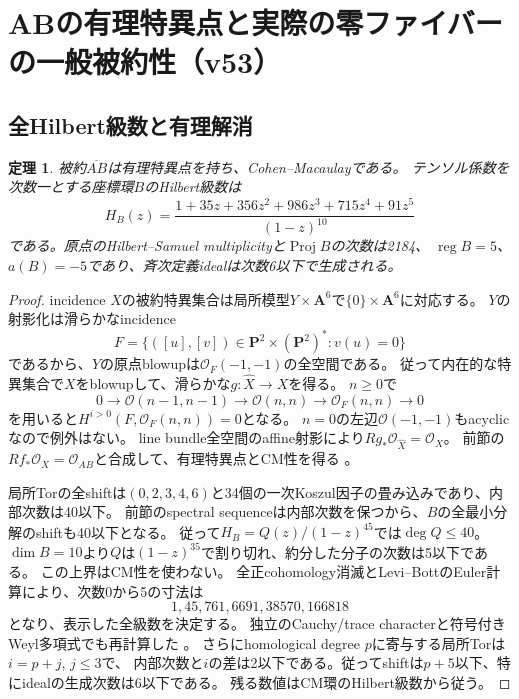 \documentclass[11pt,a4paper]{ltjsarticle}
\newcommand{\PP}{\mathbf P}
\renewcommand{\AA}{\mathbf A}
\newtheorem{theorem}{定理}[section]
\theoremstyle{remark}
\begin{document}
\section{ABの有理特異点と実際の零ファイバーの一般被約性（v53）}
\label{sec:v53}
\subsection{全Hilbert級数と有理解消}
\begin{theorem}
被約$\overline{AB}$は有理特異点を持ち、Cohen--Macaulayである。
テンソル係数を次数一とする座標環$B$のHilbert級数は
\[
 H_B(z)=\frac{1+35z+356z^2+986z^3+715z^4+91z^5}{(1-z)^{10}}
\]
である。原点のHilbert--Samuel multiplicityと$\operatorname{Proj}B$の次数は2184、
$\operatorname{reg}B=5$、$a(B)=-5$であり、斉次定義idealは次数6以下で生成される。
\end{theorem}
\begin{proof}
incidence $X$の被約特異集合は局所模型$Y\times\AA^6$で$\{0\}\times\AA^6$に対応する。
$Y$の射影化は滑らかなincidence
\[
 F=\{([u],[v])\in\PP^2\times(\PP^2)^*:v(u)=0\}
\]
であるから、$Y$の原点blowupは$\mathcal O_F(-1,-1)$の全空間である。
従って内在的な特異集合で$X$をblowupして、滑らかな$g:\widehat X\to X$を得る。
$n\ge0$で
\[
 0\to\mathcal O(n-1,n-1)\to\mathcal O(n,n)\to\mathcal O_F(n,n)\to0
\]
を用いると$H^{i>0}(F,\mathcal O_F(n,n))=0$となる。
$n=0$の左辺$\mathcal O(-1,-1)$もacyclicなので例外はない。
line bundle全空間のaffine射影により$Rg_*\mathcal O_{\widehat X}=\mathcal O_X$。
前節の$Rf_*\mathcal O_X=\mathcal O_{AB}$と合成して、有理特異点とCM性を得る
\cite{ab-rational-v53,smith-rational-v53}。

局所Torの全shiftは$(0,2,3,4,6)$と34個の一次Koszul因子の畳み込みであり、内部次数は40以下。
前節のspectral sequenceは内部次数を保つから、$B$の全最小分解のshiftも40以下となる。
従って$H_B=Q(z)/(1-z)^{45}$では$\deg Q\le40$。
$\dim B=10$より$Q$は$(1-z)^{35}$で割り切れ、約分した分子の次数は5以下である。
この上界はCM性を使わない。
全正cohomology消滅とLevi--BottのEuler計算により、次数0から5の寸法は
\[
 1,45,761,6691,38570,166818
\]
となり、表示した全級数を決定する。
独立のCauchy/trace characterと符号付きWeyl多項式でも再計算した
\cite{ab-rational-review-v53}。
さらにhomological degree $p$に寄与する局所Torは$i=p+j$, $j\le3$で、
内部次数と$i$の差は2以下である。従ってshiftは$p+5$以下、特にidealの生成次数は6以下である。
残る数値はCM環のHilbert級数から従う。
\end{proof}
\end{document}
